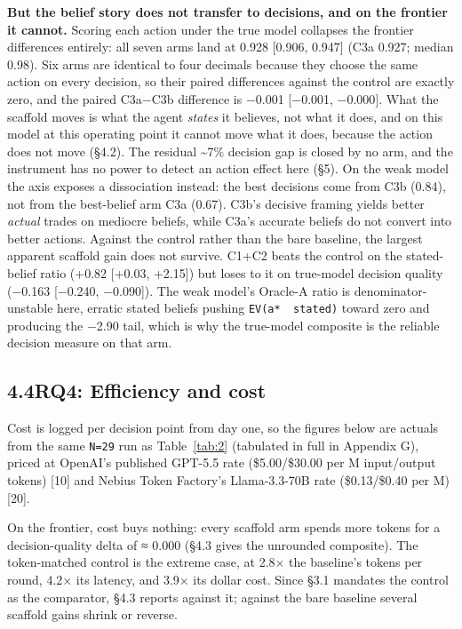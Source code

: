 \documentclass[
  10pt,
]{article}
\begin{document}
\textbf{But the belief story does not transfer to decisions, and on the frontier it cannot.} Scoring each action under the true model collapses the frontier differences entirely: all seven arms land at 0.928 {[}0.906, 0.947{]} (C3a 0.927; median 0.98). Six arms are identical to four decimals because they choose the same action on every decision, so their paired differences against the control are exactly zero, and the paired C3a−C3b difference is −0.001 {[}−0.001, −0.000{]}. What the scaffold moves is what the agent \emph{states} it believes, not what it does, and on this model at this operating point it cannot move what it does, because the action does not move (§4.2). The residual \textasciitilde7\% decision gap is closed by no arm, and the instrument has no power to detect an action effect here (§5). On the weak model the axis exposes a dissociation instead: the best decisions come from C3b (0.84), not from the best-belief arm C3a (0.67). C3b's decisive framing yields better \emph{actual} trades on mediocre beliefs, while C3a's accurate beliefs do not convert into better actions. Against the control rather than the bare baseline, the largest apparent scaffold gain does not survive. C1+C2 beats the control on the stated-belief ratio (+0.82 {[}+0.03, +2.15{]}) but loses to it on true-model decision quality (−0.163 {[}−0.240, −0.090{]}). The weak model's Oracle-A ratio is denominator-unstable here, erratic stated beliefs pushing \texttt{EV(a*\ \textbar{}\ stated)} toward zero and producing the −2.90 tail, which is why the true-model composite is the reliable decision measure on that arm.

\subsection{4.4\quad RQ4: Efficiency and cost}\label{rq4-efficiency-and-cost}

Cost is logged per decision point from day one, so the figures below are actuals from the same \texttt{N=29} run as Table~\ref{tab:2} (tabulated in full in Appendix G), priced at OpenAI's published GPT-5.5 rate (\$5.00/\$30.00 per M input/output tokens) {[}10{]} and Nebius Token Factory's Llama-3.3-70B rate (\$0.13/\$0.40 per M) {[}20{]}.

On the frontier, cost buys nothing: every scaffold arm spends more tokens for a decision-quality delta of ≈ 0.000 (§4.3 gives the unrounded composite). The token-matched control is the extreme case, at 2.8× the baseline's tokens per round, 4.2× its latency, and 3.9× its dollar cost. Since §3.1 mandates the control as the comparator, §4.3 reports against it; against the bare baseline several scaffold gains shrink or reverse.
\end{document}

